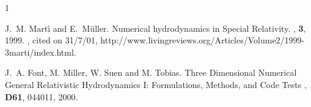 \documentclass{article}
\begin{document}
\begin{thebibliography}{1}

J.~M. Mart{\'{\i}} and E.~M{\"u}ller.
\newblock Numerical hydrodynamics in {S}pecial {R}elativity.
, {\bf 3}, 1999.
, cited on 31/7/01,
  http://www.livingreviews.org/Articles/Volume2/1999-3marti/index.html.

J.~A. Font, M. Miller, W. Suen and M. Tobias.
\newblock Three Dimensional Numerical General Relativistic
Hydrodynamics I: Formulations, Methods, and Code Tests
, {\bf D61}, 044011, 2000.

\end{thebibliography}





\end{document}
